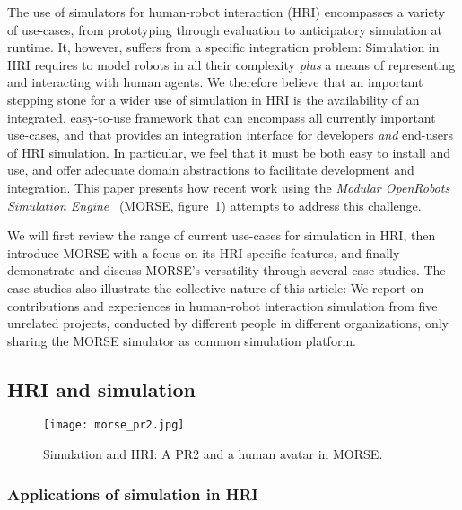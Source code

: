 \documentclass{llncs}
\begin{document}
The use of simulators for human-robot interaction (HRI) encompasses a variety of
use-cases, from prototyping through evaluation to anticipatory simulation at
runtime. It, however, suffers from a specific integration problem: Simulation in
HRI requires to model robots in all their complexity \emph{plus} a means of
representing and interacting with human agents. We therefore believe that an
important stepping stone for a wider use of simulation in HRI is the
availability of an integrated, easy-to-use framework that can encompass all
currently important use-cases, and that provides an integration interface for
developers \emph{and} end-users of HRI simulation.  In particular, we feel that
it must be both easy to install and use, and offer adequate domain abstractions
to facilitate development and integration. This paper presents how recent work
using the \emph{Modular OpenRobots Simulation Engine}~\cite{morse_simpar_2012}
(MORSE, figure~\ref{fig|morse-hri}) attempts to address this challenge. 

We will first review the range of current use-cases for simulation in HRI, then
introduce MORSE with a focus on its HRI specific features, and finally
demonstrate and discuss MORSE's versatility through several case studies. The
case studies also illustrate the collective nature of this article: We report on
contributions and experiences in human-robot interaction simulation from five
unrelated projects, conducted by different people in different organizations,
only sharing the MORSE simulator as common simulation platform. 


\subsection*{HRI and simulation}

\begin{figure}[t]
      \centering 
      \texttt{[image: morse\_pr2.jpg]}
      \caption{Simulation and HRI: A PR2 and a human avatar in MORSE.}
      \label{fig|morse-hri}
\end{figure}

\subsubsection*{Applications of simulation in HRI}
\end{document}
